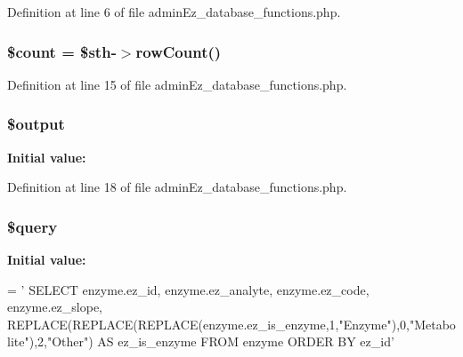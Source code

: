 Definition at line 6 of file admin\-Ez\-\_\-database\-\_\-functions.\-php.

\hypertarget{admin_ez__database__functions_8php_af789423037bbc89dc7c850e761177570}{
\subsubsection[{\$count}]{\setlength{\rightskip}{0pt plus 5cm}\$count = \$sth-\/$>$row\-Count()}}\label{admin_ez__database__functions_8php_af789423037bbc89dc7c850e761177570}


Definition at line 15 of file admin\-Ez\-\_\-database\-\_\-functions.\-php.

\hypertarget{admin_ez__database__functions_8php_a73004ce9cd673c1bfafd1dc351134797}{
\subsubsection[{\$output}]{\setlength{\rightskip}{0pt plus 5cm}\$output}}\label{admin_ez__database__functions_8php_a73004ce9cd673c1bfafd1dc351134797}
{\bfseries Initial value\-:}


Definition at line 18 of file admin\-Ez\-\_\-database\-\_\-functions.\-php.

\hypertarget{admin_ez__database__functions_8php_af59a5f7cd609e592c41dc3643efd3c98}{
\subsubsection[{\$query}]{\setlength{\rightskip}{0pt plus 5cm}\$query}}\label{admin_ez__database__functions_8php_af59a5f7cd609e592c41dc3643efd3c98}
{\bfseries Initial value\-:}
\begin{DoxyCode}
= \textcolor{stringliteral}{'}
\textcolor{stringliteral}{    SELECT enzyme.ez\_id, enzyme.ez\_analyte, enzyme.ez\_code, enzyme.ez\_slope,
       REPLACE(REPLACE(REPLACE(enzyme.ez\_is\_enzyme,1,"Enzyme"),0,"Metabolite"),2,"Other") AS ez\_is\_enzyme}
\textcolor{stringliteral}{    FROM enzyme}
\textcolor{stringliteral}{    ORDER BY ez\_id'}
\end{DoxyCode}


